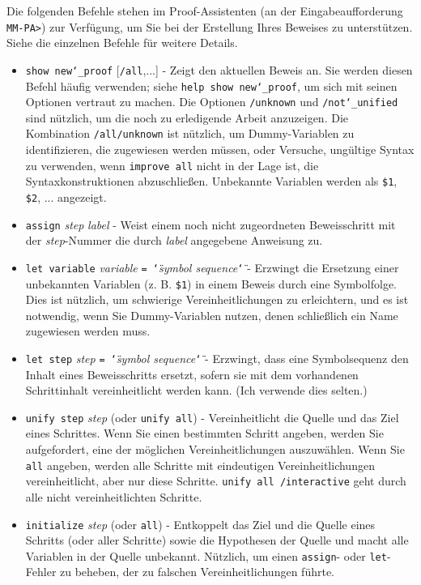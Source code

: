 Die folgenden Befehle stehen im Proof-Assistenten (an der Eingabeaufforderung \texttt{MM-PA>}) zur Verfügung, um Sie bei der Erstellung Ihres Beweises zu unterstützen.  Siehe die einzelnen Befehle für weitere Details.

\begin{itemize}
\item[]
    \texttt{show new{\char`\_}proof} [\texttt{/all},...] - Zeigt den aktuellen Beweis an.  Sie werden diesen Befehl häufig verwenden; siehe \texttt{help show new{\char`\_}proof}, um sich mit seinen Optionen vertraut zu machen.  Die Optionen \texttt{/unknown} und \texttt{/not{\char`\_}unified} sind nützlich, um die noch zu erledigende Arbeit anzuzeigen.  Die Kombination \texttt{/all/unknown} ist nützlich, um Dummy-Variablen zu identifizieren, die zugewiesen werden müssen, oder Versuche, ungültige Syntax zu verwenden, wenn \texttt{improve all} nicht in der Lage ist, die Syntaxkonstruktionen abzuschließen.  Unbekannte Variablen werden als \texttt{\$1}, \texttt{\$2}, ... angezeigt.
\item[]
    \texttt{assign} {\em step} {\em label} - Weist einem noch nicht zugeordneten Beweisschritt mit der {\em step}-Nummer die durch {\em label} angegebene Anweisung zu.
\item[]
    \texttt{let variable} {\em variable}
        \texttt{= \char`\"}{\em symbol sequence}\texttt{\char`\"}
          - Erzwingt die Ersetzung einer unbekannten Variablen (z. B. \texttt{\$1}) in einem Beweis durch eine Symbolfolge. Dies ist nützlich, um schwierige Vereinheitlichungen zu erleichtern, und es ist notwendig, wenn Sie Dummy-Variablen nutzen, denen schließlich ein Name zugewiesen werden muss.
\item[]
    \texttt{let step} {\em step} \texttt{= \char`\"}{\em symbol sequence}\texttt{\char`\"} - Erzwingt, dass eine Symbolsequenz den Inhalt eines Beweisschritts ersetzt, sofern sie mit dem vorhandenen Schrittinhalt vereinheitlicht werden kann.  (Ich verwende dies selten.)
\item[]
    \texttt{unify step} {\em step} (oder \texttt{unify all}) - Vereinheitlicht die Quelle und das Ziel eines Schrittes.  Wenn Sie einen bestimmten Schritt angeben, werden Sie aufgefordert, eine der möglichen Vereinheitlichungen auszuwählen.  Wenn Sie \texttt{all} angeben, werden alle Schritte mit eindeutigen Vereinheitlichungen vereinheitlicht, aber nur diese Schritte.  \texttt{unify all /interactive} geht durch alle nicht vereinheitlichten Schritte.
\item[]
    \texttt{initialize} {\em step} (oder \texttt{all}) - Entkoppelt das Ziel und die Quelle eines Schritts (oder aller Schritte) sowie die Hypothesen der Quelle und macht alle Variablen in der Quelle unbekannt.  Nützlich, um einen \texttt{assign}- oder \texttt{let}-Fehler zu beheben, der zu falschen Vereinheitlichungen führte.

\end{itemize}
